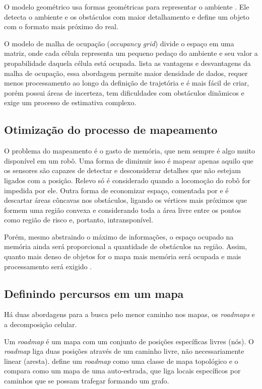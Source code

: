 O modelo geométrico usa formas geométricas para representar o ambiente \cite{Choset2005}. Ele detecta o ambiente e os obstáculos com maior detalhamento e define um objeto com o formato mais próximo do real. 

O modelo de malha de ocupação (\textit{occupancy grid}) divide o espaço em uma matriz, onde cada célula representa um pequeno pedaço do ambiente e seu valor a propabilidade daquela célula está ocupada. \cite{Borenstein1996} lista as vantagens e desvantagens da malha de ocupação, essa abordagem permite maior densidade de dados, requer menos processamento ao longo da definição de trajetória e é mais fácil de criar, porém possui áreas de incerteza, tem dificuldades com obstáculos dinâmicos e exige um processo de estimativa complexo.

\subsection{Otimização do processo de mapeamento}

O problema do mapeamento é o gasto de memória, que nem sempre é algo muito disponível em um robô. Uma forma de diminuir isso é mapear apenas aquilo que os sensores são capazes de detectar e desconsiderar detalhes que não estejam ligados com a posição. Relevo só é considerado quando a locomoção do robô for impedida por ele. Outra forma de economizar espaço, comentada por \cite{Siegwart2004} e \cite{Guzman2008} é descartar áreas côncavas nos obstáculos, ligando os vértices mais próximos que formem uma região convexa e considerando toda a área livre entre os pontos como região de risco e, portanto, intransponível.

Porém, mesmo abstraindo o máximo de informações, o espaço ocupado na memória ainda será proporcional a quantidade de obstáculos na região. Assim, quanto mais denso de objetos for o mapa mais memória será ocupada e mais processamento será exigido \cite{Siegwart2004}.

\subsection{Definindo percursos em um mapa}

Há duas abordagens para a busca pelo menor caminho nos mapas, os \textit{roadmaps} e a decomposição celular.

Um \textit{roadmap} é um mapa com um conjunto de posições específicas livres (nós). O \textit{roadmap} liga duas posições através de um caminho livre, não necessariamente linear (aresta). \cite{Choset2005} define um \textit{roadmap} como uma classe de mapa topológico e o compara como um mapa de uma auto-estrada, que liga locais específicos por caminhos que se possam trafegar formando um grafo.

